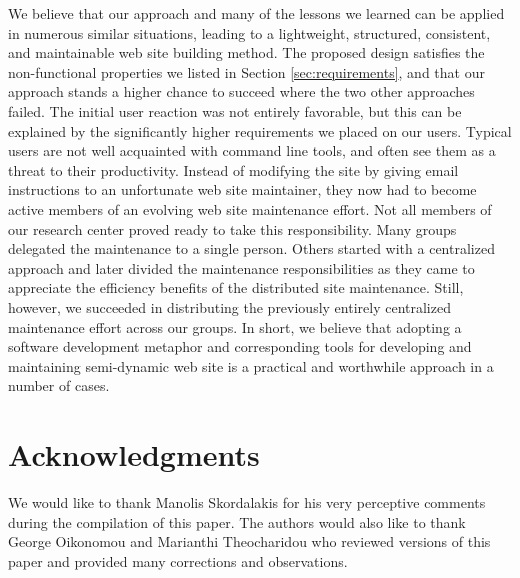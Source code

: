 \documentclass{elsart}
\begin{document}
We believe that our approach and many of the lessons we learned
can be applied in numerous similar situations,
leading to a lightweight, structured, consistent, and maintainable
web site building method. The proposed design satisfies the non-functional properties
we listed in Section \ref{sec:requirements},
and that our approach stands a higher chance to succeed where the
two other approaches failed.
The initial user reaction was not entirely favorable, but this can
be explained by the significantly higher requirements we
placed on our users. Typical users are not well acquainted
with command line tools, and often see them as a threat to their productivity.
Instead of modifying the site by giving email instructions to an unfortunate
web site maintainer, they now had to become active members
of an evolving web site maintenance effort.
Not all members of our research center proved ready to take
this responsibility.
Many groups delegated the maintenance to a single person. 
Others started with a centralized approach and later divided the
maintenance responsibilities as they came to appreciate the efficiency
benefits of the distributed site maintenance.
Still, however, we succeeded in distributing the previously
entirely centralized maintenance effort across our groups.
In short, we believe that adopting a software development
metaphor and corresponding tools for developing and maintaining semi-dynamic
web site is a practical and worthwhile approach in a number of cases.

\section{Acknowledgments}
\label{sec:ack}

We would like to thank Manolis Skordalakis for his very perceptive comments during the compilation of this paper.
The authors would also like to thank George Oikonomou and Marianthi Theocharidou who reviewed versions 
of this paper and provided many corrections and observations.



\end{document}
